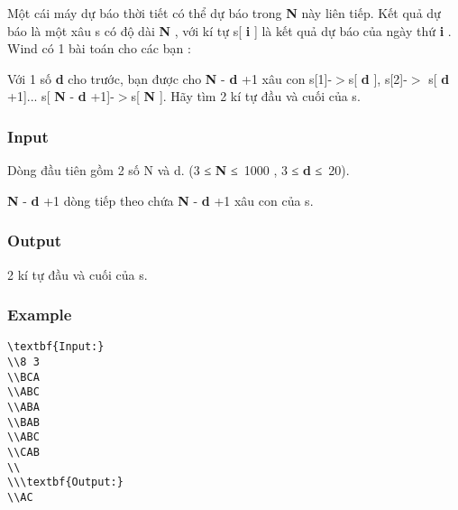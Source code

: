 



   Một cái máy dự báo thời tiết có thể dự báo trong   \textbf{    N   }   này liên tiếp. Kết quả dự báo là một xâu s có độ dài   \textbf{    N   }   , với kí tự s[   \textbf{    i   }   ] là kết quả dự báo của ngày thứ   \textbf{    i   }   . Wind có 1 bài toán cho các bạn :  

   Với 1 số   \textbf{    d   }   cho trước, bạn được cho   \textbf{    N   }   -   \textbf{    d   }   +1 xâu con s[1]-$>$s[   \textbf{    d   }   ], s[2]-$>$ s[   \textbf{    d   }   +1]... s[   \textbf{    N   }   -   \textbf{    d   }   +1]-$>$s[   \textbf{    N   }   ]. Hãy tìm 2 kí tự đầu và cuối của s.  

\subsubsection{   Input  }

   Dòng đầu tiên gồm 2 số N và d. (3 ≤   \textbf{    N   }   ≤ 1000 , 3 ≤   \textbf{    d   }   ≤ 20).  

\textbf{    N   }   -   \textbf{    d   }   +1 dòng tiếp theo chứa   \textbf{    N   }   -   \textbf{    d   }   +1 xâu con của s.  

\subsubsection{   Output  }

   2 kí tự đầu và cuối của s.  

\subsubsection{   Example  }
\begin{verbatim}
\textbf{Input:}
\\8 3
\\BCA
\\ABC
\\ABA
\\BAB
\\ABC
\\CAB
\\
\\\textbf{Output:}
\\AC\end{verbatim}